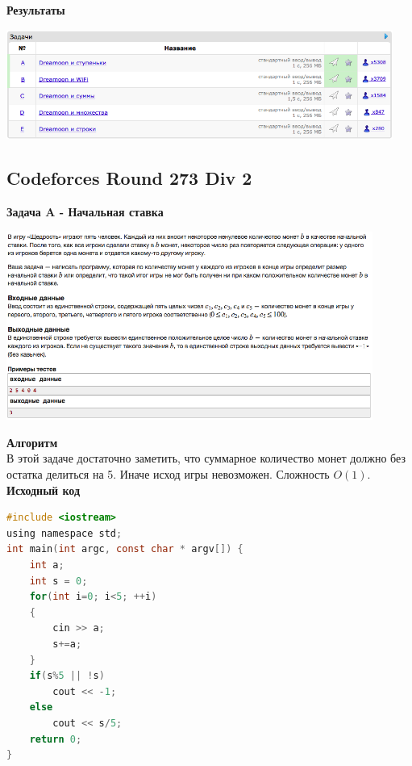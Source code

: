 \documentclass[a4paper,12pt]{article}
\begin{document}
\textbf{{\large Результаты}} \\
\begin{center}
\includegraphics[width=0.95\textwidth]{C_272/A_C_272_result.png}\\ [1cm]
\end{center}

%
%

\newpage
\subsection{Codeforces Round 273 Div 2}

\textbf{{\large Задача A - Начальная ставка}} \\
\begin{center}
\includegraphics[width=0.9\textwidth]{C_273/C_273_A.png}\\ [1cm]
\end{center}
\textbf{{\large Алгоритм}} \\
В этой задаче достаточно заметить, что суммарное количество монет должно без остатка делиться на 5. Иначе исход игры невозможен. Сложность $O(1)$.\\

\textbf{{\large Исходный код}}
\begin{lstlisting}[language=C]
#include <iostream>
using namespace std;
int main(int argc, const char * argv[]) {
    int a;
    int s = 0;
    for(int i=0; i<5; ++i)
    {
        cin >> a;
        s+=a;
    }
    if(s%5 || !s)
        cout << -1;
    else
        cout << s/5;
    return 0;
}
\end{lstlisting}
\end{document}
